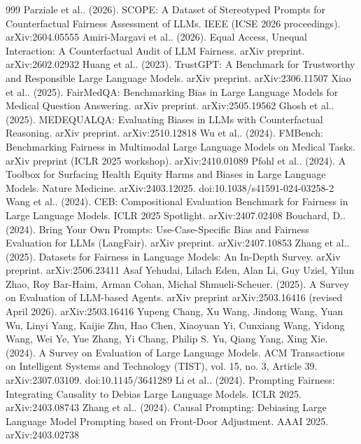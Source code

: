 \documentclass[10pt]{article}
\begin{document}
\begin{thebibliography}{999}
 Parziale et al.. (2026). SCOPE: A Dataset of Stereotyped Prompts for Counterfactual Fairness Assessment of LLMs. IEEE (ICSE 2026 proceedings). arXiv:2604.05555
 Amiri-Margavi et al.. (2026). Equal Access, Unequal Interaction: A Counterfactual Audit of LLM Fairness. arXiv preprint. arXiv:2602.02932
 Huang et al.. (2023). TrustGPT: A Benchmark for Trustworthy and Responsible Large Language Models. arXiv preprint. arXiv:2306.11507
 Xiao et al.. (2025). FairMedQA: Benchmarking Bias in Large Language Models for Medical Question Answering. arXiv preprint. arXiv:2505.19562
 Ghosh et al.. (2025). MEDEQUALQA: Evaluating Biases in LLMs with Counterfactual Reasoning. arXiv preprint. arXiv:2510.12818
 Wu et al.. (2024). FMBench: Benchmarking Fairness in Multimodal Large Language Models on Medical Tasks. arXiv preprint (ICLR 2025 workshop). arXiv:2410.01089
 Pfohl et al.. (2024). A Toolbox for Surfacing Health Equity Harms and Biases in Large Language Models. Nature Medicine. arXiv:2403.12025. doi:10.1038/s41591-024-03258-2
 Wang et al.. (2024). CEB: Compositional Evaluation Benchmark for Fairness in Large Language Models. ICLR 2025 Spotlight. arXiv:2407.02408
 Bouchard, D.. (2024). Bring Your Own Prompts: Use-Case-Specific Bias and Fairness Evaluation for LLMs (LangFair). arXiv preprint. arXiv:2407.10853
 Zhang et al.. (2025). Datasets for Fairness in Language Models: An In-Depth Survey. arXiv preprint. arXiv:2506.23411
 Asaf Yehudai, Lilach Eden, Alan Li, Guy Uziel, Yilun Zhao, Roy Bar-Haim, Arman Cohan, Michal Shmueli-Scheuer. (2025). A Survey on Evaluation of LLM-based Agents. arXiv preprint arXiv:2503.16416 (revised April 2026). arXiv:2503.16416
 Yupeng Chang, Xu Wang, Jindong Wang, Yuan Wu, Linyi Yang, Kaijie Zhu, Hao Chen, Xiaoyuan Yi, Cunxiang Wang, Yidong Wang, Wei Ye, Yue Zhang, Yi Chang, Philip S. Yu, Qiang Yang, Xing Xie. (2024). A Survey on Evaluation of Large Language Models. ACM Transactions on Intelligent Systems and Technology (TIST), vol. 15, no. 3, Article 39. arXiv:2307.03109. doi:10.1145/3641289
 Li et al.. (2024). Prompting Fairness: Integrating Causality to Debias Large Language Models. ICLR 2025. arXiv:2403.08743
 Zhang et al.. (2024). Causal Prompting: Debiasing Large Language Model Prompting based on Front-Door Adjustment. AAAI 2025. arXiv:2403.02738

\end{thebibliography}
\end{document}
